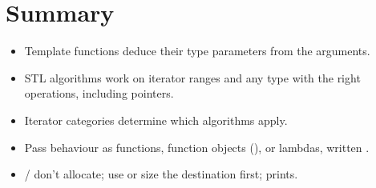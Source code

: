 \section*{Summary}
\begin{itemize}
  \item Template functions deduce their type parameters from the arguments.
  \item STL algorithms work on iterator ranges \code{[first, last)} and any
        type with the right operations, including pointers.
  \item Iterator categories determine which algorithms apply.
  \item Pass behaviour as functions, function objects (), or
        lambdas, written
        .
  \item {}/ don't allocate; use 
        or size the destination first;  prints.
\end{itemize}

